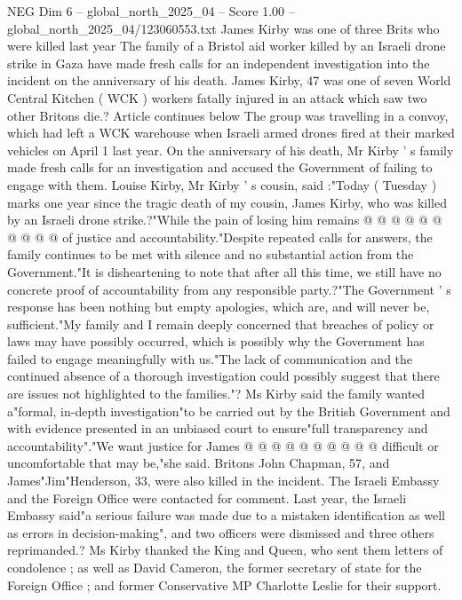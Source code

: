 \begin{textsample}{NEG Dim 6 – global\_north\_2025\_04 – Score 1.00 – global\_north\_2025\_04/123060553.txt}  \label{ex:f6_neg_240}
James Kirby was one of three Brits who were killed last year The family of a Bristol aid worker killed by an Israeli drone strike in Gaza have made fresh calls for an independent investigation into the incident on the anniversary of his death.
James Kirby, 47 was one of seven World Central Kitchen ( WCK ) workers fatally injured in an attack which saw two other Britons die.?
Article continues below The group was travelling in a convoy, which had left a WCK warehouse when Israeli armed drones fired at their marked vehicles on April 1 last year.
On the anniversary of his death, Mr Kirby ' s family made fresh calls for an investigation and accused the Government of failing to engage with them.
Louise Kirby, Mr Kirby ' s cousin, said :"Today ( Tuesday ) marks one year since the tragic death of my cousin, James Kirby, who was killed by an Israeli drone strike.?"While the pain of losing him remains @ @ @ @ @ @ @ @ @ @ of justice and accountability."Despite repeated calls for answers, the family continues to be met with silence and no substantial action from the Government."It is disheartening to note that after all this time, we still have no concrete proof of accountability from any responsible party.?"The Government ' s response has been nothing but empty apologies, which are, and will never be, sufficient."My family and I remain deeply concerned that breaches of policy or laws may have possibly occurred, which is possibly why the Government has failed to engage meaningfully with us."The lack of communication and the continued absence of a thorough investigation could possibly suggest that there are issues not highlighted to the families."?
Ms Kirby said the family wanted a"formal, in-depth investigation"to be carried out by the British Government and with evidence presented in an unbiased court to ensure"full transparency and accountability"."We want justice for James @ @ @ @ @ @ @ @ @ @ difficult or uncomfortable that may be,"she said.
Britons John Chapman, 57, and James"Jim"Henderson, 33, were also killed in the incident.
The Israeli Embassy and the Foreign Office were contacted for comment.
Last year, the Israeli Embassy said"a serious failure was made due to a mistaken identification as well as errors in decision-making", and two officers were dismissed and three others reprimanded.?
Ms Kirby thanked the King and Queen, who sent them letters of condolence ; as well as David Cameron, the former secretary of state for the Foreign Office ; and former Conservative MP Charlotte Leslie for their support.

\end{textsample}
